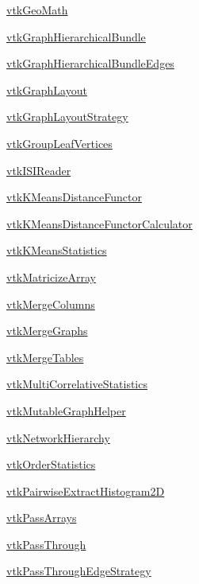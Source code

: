 \begin{DoxyItemize}
\item \hyperlink{vtkinfovis_vtkgeomath}{vtk\-Geo\-Math}  
\item \hyperlink{vtkinfovis_vtkgraphhierarchicalbundle}{vtk\-Graph\-Hierarchical\-Bundle}  
\item \hyperlink{vtkinfovis_vtkgraphhierarchicalbundleedges}{vtk\-Graph\-Hierarchical\-Bundle\-Edges}  
\item \hyperlink{vtkinfovis_vtkgraphlayout}{vtk\-Graph\-Layout}  
\item \hyperlink{vtkinfovis_vtkgraphlayoutstrategy}{vtk\-Graph\-Layout\-Strategy}  
\item \hyperlink{vtkinfovis_vtkgroupleafvertices}{vtk\-Group\-Leaf\-Vertices}  
\item \hyperlink{vtkinfovis_vtkisireader}{vtk\-I\-S\-I\-Reader}  
\item \hyperlink{vtkinfovis_vtkkmeansdistancefunctor}{vtk\-K\-Means\-Distance\-Functor}  
\item \hyperlink{vtkinfovis_vtkkmeansdistancefunctorcalculator}{vtk\-K\-Means\-Distance\-Functor\-Calculator}  
\item \hyperlink{vtkinfovis_vtkkmeansstatistics}{vtk\-K\-Means\-Statistics}  
\item \hyperlink{vtkinfovis_vtkmatricizearray}{vtk\-Matricize\-Array}  
\item \hyperlink{vtkinfovis_vtkmergecolumns}{vtk\-Merge\-Columns}  
\item \hyperlink{vtkinfovis_vtkmergegraphs}{vtk\-Merge\-Graphs}  
\item \hyperlink{vtkinfovis_vtkmergetables}{vtk\-Merge\-Tables}  
\item \hyperlink{vtkinfovis_vtkmulticorrelativestatistics}{vtk\-Multi\-Correlative\-Statistics}  
\item \hyperlink{vtkinfovis_vtkmutablegraphhelper}{vtk\-Mutable\-Graph\-Helper}  
\item \hyperlink{vtkinfovis_vtknetworkhierarchy}{vtk\-Network\-Hierarchy}  
\item \hyperlink{vtkinfovis_vtkorderstatistics}{vtk\-Order\-Statistics}  
\item \hyperlink{vtkinfovis_vtkpairwiseextracthistogram2d}{vtk\-Pairwise\-Extract\-Histogram2\-D}  
\item \hyperlink{vtkinfovis_vtkpassarrays}{vtk\-Pass\-Arrays}  
\item \hyperlink{vtkinfovis_vtkpassthrough}{vtk\-Pass\-Through}  
\item \hyperlink{vtkinfovis_vtkpassthroughedgestrategy}{vtk\-Pass\-Through\-Edge\-Strategy}  

\end{DoxyItemize}
